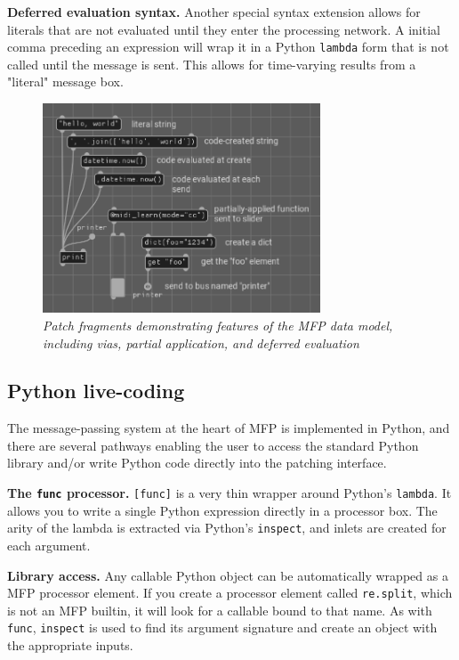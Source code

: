 \documentclass[a4paper]{article}
\def\:{\hskip0pt}
\begin{document}
{\bf Deferred evaluation syntax.} Another special syntax
extension allows for literals that are not evaluated until they
enter the processing network. A initial comma preceding an
expression will wrap it in a Python {\tt lambda} form that is not
called until the message is sent. This allows for time-varying
results from a "literal" message box.

\begin{figure}[ht]
\centerline{\includegraphics[width=3.25in]{datamodel.png}}
\caption{\label{fig:datamodel}{
    \it Patch fragments demonstrating features of the MFP data model,
    including vias, partial application, and deferred evaluation
}}
\end{figure}


\subsection{Python live-coding }

The message\:-\:passing system at the heart of MFP is implemented in
Python, and there are several pathways enabling the user to
access the standard Python library and/or write Python code
directly into the patching interface.

{\bf The {\tt func} processor.} {\tt [func]} is a very thin wrapper
around Python's {\tt lambda}. It allows you to write a single
Python expression directly in a processor box. The arity of the lambda
is extracted via Python's {\tt inspect}, and inlets are created for
each argument.

{\bf Library access.} Any callable Python object can be
automatically wrapped as a MFP processor element. If you create a
processor element called {\tt re.split}, which is not an MFP
builtin, it will look for a callable bound to that name. As with
{\tt func}, {\tt inspect} is used to find its argument signature
and create an object with the appropriate inputs.
\end{document}
